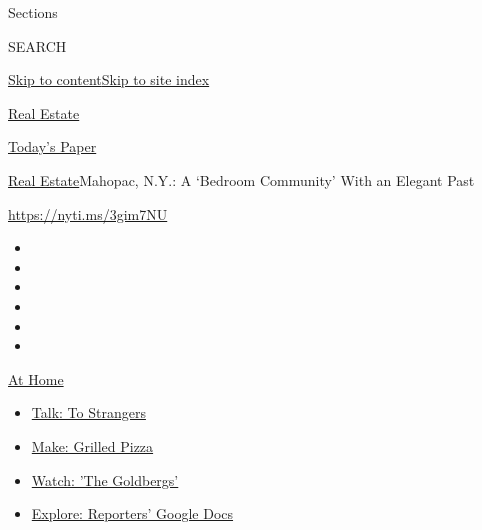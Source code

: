 Sections

SEARCH

\protect\hyperlink{site-content}{Skip to
content}\protect\hyperlink{site-index}{Skip to site index}

\href{https://www.nytimes3xbfgragh.onion/section/realestate}{Real
Estate}

\href{https://myaccount.nytimes3xbfgragh.onion/auth/login?response_type=cookie\&client_id=vi}{}

\href{https://www.nytimes3xbfgragh.onion/section/todayspaper}{Today's
Paper}

\href{/section/realestate}{Real Estate}\textbar{}Mahopac, N.Y.: A
`Bedroom Community' With an Elegant Past

\url{https://nyti.ms/3gim7NU}

\begin{itemize}
\item
\item
\item
\item
\item
\item
\end{itemize}

\href{https://www.nytimes3xbfgragh.onion/spotlight/at-home?action=click\&pgtype=Article\&state=default\&region=TOP_BANNER\&context=at_home_menu}{At
Home}

\begin{itemize}
\tightlist
\item
  \href{https://www.nytimes3xbfgragh.onion/2020/08/03/well/family/the-benefits-of-talking-to-strangers.html?action=click\&pgtype=Article\&state=default\&region=TOP_BANNER\&context=at_home_menu}{Talk:
  To Strangers}
\item
  \href{https://www.nytimes3xbfgragh.onion/2020/08/01/at-home/coronavirus-make-pizza-on-a-grill.html?action=click\&pgtype=Article\&state=default\&region=TOP_BANNER\&context=at_home_menu}{Make:
  Grilled Pizza}
\item
  \href{https://www.nytimes3xbfgragh.onion/2020/07/31/arts/television/goldbergs-abc-stream.html?action=click\&pgtype=Article\&state=default\&region=TOP_BANNER\&context=at_home_menu}{Watch:
  'The Goldbergs'}
\item
  \href{https://www.nytimes3xbfgragh.onion/interactive/2020/at-home/even-more-reporters-editors-diaries-lists-recommendations.html?action=click\&pgtype=Article\&state=default\&region=TOP_BANNER\&context=at_home_menu}{Explore:
  Reporters' Google Docs}
\end{itemize}

